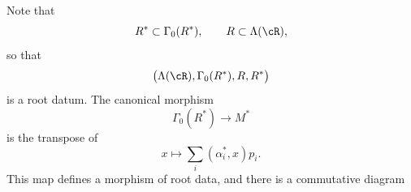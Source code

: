 \begin{corollary}\label{sga3:XXI:6.6.6}
Note that
\[
 R^\ast\subset\Gamma_0(R^\ast),
 \qquad
 R\subset\Lambda(\cR),
\]
so that
\[
 \bigl(\Lambda(\cR),\Gamma_0(R^\ast),R,R^\ast\bigr)
\]
is a root datum. The canonical morphism
\[
 \Gamma_0(R^\ast)\longrightarrow M^\ast
\]
is the transpose of
\[
 x\longmapsto\sum_i(\alpha_i^\ast,x)p_i.
\]
This map defines a morphism of root data, and there is a commutative
diagram
\begin{center}
\end{center}
\end{corollary}
